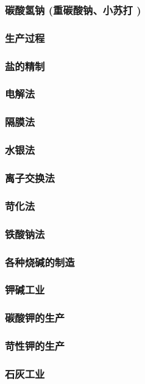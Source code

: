 \documentclass[UTF8]{../../ApplicationUniverse}
\begin{document}
            \subsubsection{碳酸氢钠 (重碳酸钠、小苏打 )}
        \subsubsection{生产过程}
            \subsubsection{盐的精制}
            \subsubsection{电解法}
                \subsubsection{隔膜法}
                \subsubsection{水银法}
                \subsubsection{离子交换法}
            \subsubsection{苛化法}
            \subsubsection{铁酸钠法}
            \subsubsection{各种烧碱的制造}
    \subsubsection{钾碱工业}
        \subsubsection{碳酸钾的生产}
        \subsubsection{苛性钾的生产}
    \subsubsection{石灰工业}
\end{document}
